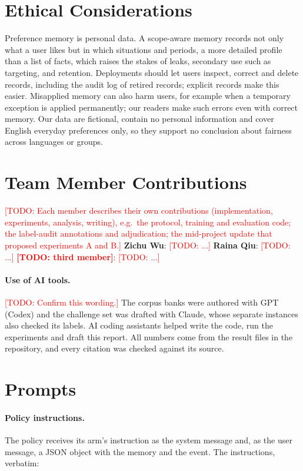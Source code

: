 \documentclass[11pt]{article}
\newcommand{\todo}[1]{\textcolor{red}{[TODO: #1]}}
\begin{document}
\section*{Ethical Considerations}
Preference memory is personal data. A scope-aware memory records not only what a user likes but in which situations and periods, a more detailed profile than a list of facts, which raises the stakes of leaks, secondary use such as targeting, and retention. Deployments should let users inspect, correct and delete records, including the audit log of retired records; explicit records make this easier. Misapplied memory can also harm users, for example when a temporary exception is applied permanently; our readers make such errors even with correct memory. Our data are fictional, contain no personal information and cover English everyday preferences only, so they support no conclusion about fairness across languages or groups.

\section*{Team Member Contributions}
\todo{Each member describes their own contributions (implementation, experiments, analysis, writing), e.g.\ the protocol, training and evaluation code; the label-audit annotations and adjudication; the mid-project update that proposed experiments A and B.}
\textbf{Zichu Wu}: \todo{...} \textbf{Raina Qiu}: \todo{...} \textbf{\todo{third member}}: \todo{...}

\paragraph{Use of AI tools.} \todo{Confirm this wording.} The corpus banks were authored with GPT (Codex) and the challenge set was drafted with Claude, whose separate instances also checked its labels. AI coding assistants helped write the code, run the experiments and draft this report. All numbers come from the result files in the repository, and every citation was checked against its source.



\appendix

\section{Prompts}\label{app:prompts}

\paragraph{Policy instructions.} The policy receives its arm's instruction as the system message and, as the user message, a JSON object with the memory and the event. The instructions, verbatim:
\end{document}
